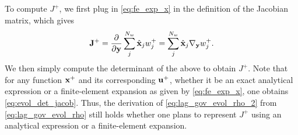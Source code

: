 \documentclass[11pt]{report}
\begin{document}
To compute $J^+$, we first plug in \cref{eq:fe_exp_x} in the definition of the Jacobian matrix, which gives
\begin{equation*}
    \mathbf{J}^+ = \frac{\partial}{\partial \mathbf{y}} \sum_j^{N_w} \hat{\mathbf{x}}_j w^+_j = \sum_j^{N_w} \hat{\mathbf{x}}_j \nabla_{\mathbf{y}} w^+_j.
\end{equation*}
We then simply compute the determinant of the above to obtain $J^+$. Note that for any function $\mathbf{x}^+$ and its corresponding $\mathbf{u}^+$, whether it be an exact analytical expression or a finite-element expansion as given by \cref{eq:fe_exp_x}, one obtains \cref{eq:evol_det_jacob}. Thus, the derivation of \cref{eq:lag_gov_evol_rho_2} from \cref{eq:lag_gov_evol_rho} still holds whether one plans to represent $J^+$ using an analytical expression or a finite-element expansion. 

\end{document}
